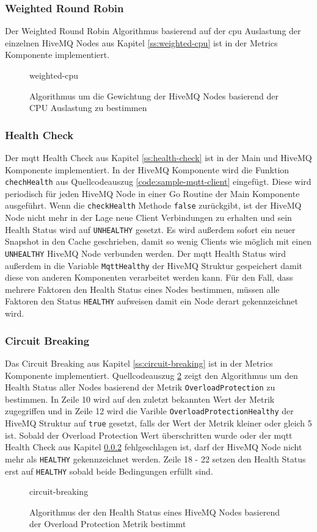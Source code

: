 \subsubsection{Weighted Round Robin}
Der Weighted Round Robin Algorithmus basierend auf der \ac{cpu} Auslastung der einzelnen HiveMQ Nodes aus Kapitel \ref{ss:weighted-cpu} ist in der Metrics Komponente implementiert.
\begin{figure}
    {weighted-cpu}
    \caption{Algorithmus um die Gewichtung der HiveMQ Nodes basierend der CPU Auslastung zu bestimmen}
    \label{code:weighted-cpu}
\end{figure}

\subsubsection{Health Check} \label{si:health-check}
Der \ac{mqtt} Health Check aus Kapitel \ref{ss:health-check} ist in der Main und HiveMQ Komponente implementiert. In der HiveMQ Komponente wird die Funktion \verb|chechHealth| aus Quellcodeauszug \ref{code:sample-mqtt-client} eingefügt. Diese wird periodisch für jeden HiveMQ Node in einer Go Routine der Main Komponente ausgeführt. Wenn die \verb|checkHealth| Methode \verb|false| zurückgibt, ist der HiveMQ Node nicht mehr in der Lage neue Client Verbindungen zu erhalten und sein Health Status wird auf \verb|UNHEALTHY| gesetzt. Es wird au{\ss}erdem sofort ein neuer Snapshot in den Cache geschrieben, damit so wenig Clients wie möglich mit einen \verb|UNHEALTHY| HiveMQ Node verbunden werden. Der \ac{mqtt} Health Status wird au{\ss}erdem in die Variable \verb|MqttHealthy| der HiveMQ Struktur gespeichert damit diese von anderen Komponenten verarbeitet werden kann. Für den Fall, dass mehrere Faktoren den Health Status eines Nodes bestimmen, müssen alle Faktoren den Status \verb|HEALTHY| aufweisen damit ein Node derart gekennzeichnet wird.

\subsubsection{Circuit Breaking}
Das Circuit Breaking aus Kapitel \ref{ss:circuit-breaking} ist in der Metrics Komponente implementiert. Quellcodeauszug \ref{code:circuit-breaking} zeigt den Algorithmus um den Health Status aller Nodes basierend der Metrik \verb|OverloadProtection| zu bestimmen. In Zeile 10 wird auf den zuletzt bekannten Wert der Metrik zugegriffen und in Zeile 12 wird die Varible \verb|OverloadProtectionHealthy| der HiveMQ Struktur auf \verb|true| gesetzt, falls der Wert der Metrik kleiner oder gleich 5 ist.
Sobald der Overload Protection Wert überschritten wurde oder der \ac{mqtt} Health Check aus Kapitel \ref{si:health-check} fehlgeschlagen ist, darf der HiveMQ Node nicht mehr als \verb|HEALTHY| gekennzeichnet werden. Zeile 18 - 22 setzen den Health Status erst auf \verb|HEALTHY| sobald beide Bedingungen erfüllt sind.
\begin{figure}
    {circuit-breaking}
    \caption{Algorithmus der den Health Status eines HiveMQ Nodes basierend der Overload Protection Metrik bestimmt}
    \label{code:circuit-breaking}
\end{figure}

